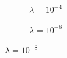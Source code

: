 \documentclass[paper=a4, fontsize=11pt]{scrartcl} %
\numberwithin{equation}{section} %
\numberwithin{figure}{section} %
\numberwithin{table}{section} %
\begin{document}
\begin{figure}[H]
\begin{subfigure}[b]{0.45\textwidth}
{		}
	\caption{$\lambda = 10^{-4}$}
	\end{subfigure}
	\begin{subfigure}[b]{0.45\textwidth}
		\noindent{}
	\caption{$\lambda = 10^{-8}$}
	\end{subfigure}
\end{figure}
\end{document}
